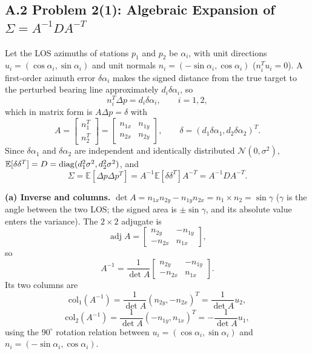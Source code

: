\subsection*{A.2 Problem 2(1): Algebraic Expansion of $\Sigma=A^{-1}DA^{-T}$}

Let the LOS azimuths of stations $p_1$ and $p_2$ be $\alpha_i$, with unit directions $u_i=(\cos\alpha_i,\sin\alpha_i)$ and unit normals $n_i=(-\sin\alpha_i,\cos\alpha_i)$ ($n_i^Tu_i=0$). A first-order azimuth error $\delta\alpha_i$ makes the signed distance from the true target to the perturbed bearing line approximately $d_i\delta\alpha_i$, so
\begin{equation}
  n_i^T\Delta p=d_i\delta\alpha_i,\qquad i=1,2,
\end{equation}
which in matrix form is $A\Delta p=\delta$ with
\begin{equation}
  A=\begin{bmatrix}n_1^T\\ n_2^T\end{bmatrix}
  =\begin{bmatrix}n_{1x}&n_{1y}\\ n_{2x}&n_{2y}\end{bmatrix},
  \qquad
  \delta=(d_1\delta\alpha_1,d_2\delta\alpha_2)^T.
\end{equation}
Since $\delta\alpha_1$ and $\delta\alpha_2$ are independent and identically distributed $\mathcal{N}(0,\sigma^2)$, $\mathbb{E}[\delta\delta^T]=D=\operatorname{diag}(d_1^2\sigma^2,d_2^2\sigma^2)$, and
\begin{equation}
  \Sigma=\mathbb{E}[\Delta p\Delta p^T]
  =A^{-1}\mathbb{E}[\delta\delta^T]A^{-T}=A^{-1}DA^{-T}.
\end{equation}

\noindent\textbf{(a) Inverse and columns.} $\det A=n_{1x}n_{2y}-n_{1y}n_{2x}=n_1\times n_2=\sin\gamma$ ($\gamma$ is the angle between the two LOS; the signed area is $\pm\sin\gamma$, and its absolute value enters the variance). The $2\times2$ adjugate is
\begin{equation}
  \operatorname{adj}A=\begin{bmatrix}n_{2y}&-n_{1y}\\ -n_{2x}&n_{1x}\end{bmatrix},
\end{equation}
so
\begin{equation}
  A^{-1}=\frac{1}{\det A}\begin{bmatrix}n_{2y}&-n_{1y}\\ -n_{2x}&n_{1x}\end{bmatrix}.
\end{equation}
Its two columns are
\begin{equation}
  \mathrm{col}_1(A^{-1})=\frac{1}{\det A}(n_{2y},-n_{2x})^T=\frac{1}{\det A}u_2,
\end{equation}
\begin{equation}
  \mathrm{col}_2(A^{-1})=\frac{1}{\det A}(-n_{1y},n_{1x})^T=-\frac{1}{\det A}u_1,
\end{equation}
using the $90^\circ$ rotation relation between $u_i=(\cos\alpha_i,\sin\alpha_i)$ and $n_i=(-\sin\alpha_i,\cos\alpha_i)$.

